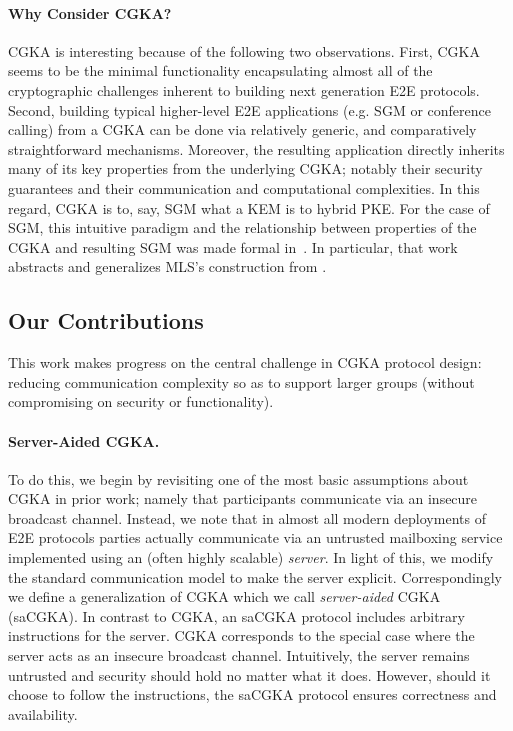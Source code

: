 \paragraph{Why Consider CGKA?}
CGKA is interesting because of the following two observations. First, CGKA
seems to be the minimal functionality encapsulating almost all of the
cryptographic challenges inherent to building next generation E2E protocols.
Second, building typical higher-level E2E applications (e.g. SGM or
conference calling) from a CGKA can be done via relatively generic, and
comparatively straightforward mechanisms. Moreover, the resulting application
directly inherits many of its key properties from the underlying CGKA;
notably their security guarantees and their communication and computational
complexities. In this regard, CGKA is to, say, SGM what a KEM is to hybrid
PKE. For the case of SGM, this intuitive paradigm and the relationship
between properties of the CGKA and resulting SGM was made formal
in~\cite{CCS:ACDT21}. In particular, that work abstracts and generalizes
MLS's construction from \protITK.

\subsection{Our Contributions}
This work makes progress on the central challenge in CGKA protocol design:
reducing communication complexity so as to support larger groups (without
compromising on security or functionality).

\paragraph{Server-Aided CGKA.}
To do this, we begin by revisiting one of the most basic assumptions about
CGKA in prior work; namely that participants communicate via an insecure
broadcast channel. Instead, we note that in almost all modern deployments of
E2E protocols parties actually communicate via an untrusted mailboxing
service implemented using an (often highly scalable) \emph{server}.
%
In light of this, we modify the standard communication model to make the
server explicit. Correspondingly we define a generalization of CGKA which we
call \emph{server-aided} CGKA (saCGKA). In contrast to CGKA, an saCGKA
protocol includes arbitrary instructions for the server. CGKA corresponds to
the special case where the server acts as an insecure broadcast channel.
Intuitively, the server remains untrusted and security should hold no matter
what it does. However, should it choose to follow the instructions, the
saCGKA protocol ensures correctness and availability.


